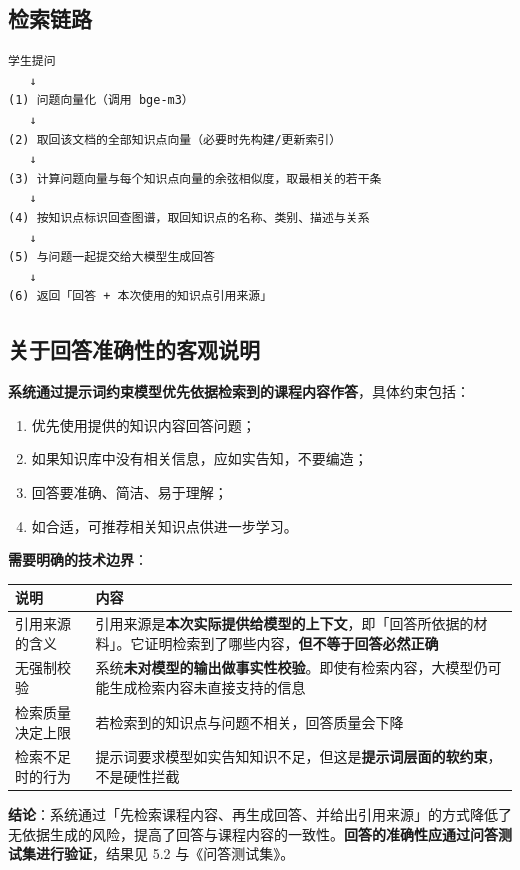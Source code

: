 \documentclass[UTF8,a4paper,11pt]{ctexrep}
\begin{document}
\subsection{检索链路}

\begin{Verbatim}[breaklines=true,breakanywhere=true,fontsize=\small,frame=single,framesep=4pt,rulecolor=\color{codeframe}]
学生提问
   ↓
(1) 问题向量化（调用 bge-m3）
   ↓
(2) 取回该文档的全部知识点向量（必要时先构建/更新索引）
   ↓
(3) 计算问题向量与每个知识点向量的余弦相似度，取最相关的若干条
   ↓
(4) 按知识点标识回查图谱，取回知识点的名称、类别、描述与关系
   ↓
(5) 与问题一起提交给大模型生成回答
   ↓
(6) 返回「回答 + 本次使用的知识点引用来源」
\end{Verbatim}


\subsection{关于回答准确性的客观说明}

\textbf{系统通过提示词约束模型优先依据检索到的课程内容作答}，具体约束包括：

\begin{enumerate}
\item 优先使用提供的知识内容回答问题；
\item 如果知识库中没有相关信息，应如实告知，不要编造；
\item 回答要准确、简洁、易于理解；
\item 如合适，可推荐相关知识点供进一步学习。
\end{enumerate}
\textbf{需要明确的技术边界}：

\begin{center}
\small
\begin{tabularx}{\linewidth}{@{}XX@{}}
\toprule
说明 & 内容 \\
\midrule
引用来源的含义 & 引用来源是\textbf{本次实际提供给模型的上下文}，即「回答所依据的材料」。它证明检索到了哪些内容，\textbf{但不等于回答必然正确} \\
无强制校验 & 系统\textbf{未对模型的输出做事实性校验}。即使有检索内容，大模型仍可能生成检索内容未直接支持的信息 \\
检索质量决定上限 & 若检索到的知识点与问题不相关，回答质量会下降 \\
检索不足时的行为 & 提示词要求模型如实告知知识不足，但这是\textbf{提示词层面的软约束}，不是硬性拦截 \\
\bottomrule
\end{tabularx}
\end{center}
\begin{notebox}
\textbf{结论}：系统通过「先检索课程内容、再生成回答、并给出引用来源」的方式降低了无依据生成的风险，提高了回答与课程内容的一致性。\textbf{回答的准确性应通过问答测试集进行验证}，结果见 5.2 与《问答测试集》。

\end{notebox}
\end{document}
